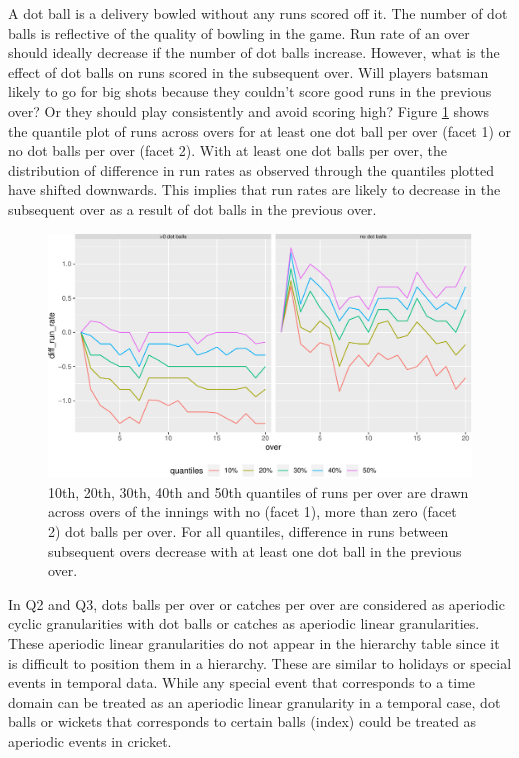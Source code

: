 \documentclass[12pt]{article}
\begin{document}
A dot ball is a delivery bowled without any runs scored off it. The number of dot balls is reflective of the quality of bowling in the game. Run rate of an over should ideally decrease if the number of dot balls increase. However, what is the effect of dot balls on runs scored in the subsequent over. Will players batsman likely to go for big shots because they couldn't score good runs in the previous over? Or they should play consistently and avoid scoring high? Figure \ref{fig:exdot} shows the quantile plot of runs across overs for at least one dot ball per over (facet 1) or no dot balls per over (facet 2).
With at least one dot balls per over, the distribution of difference in run rates as observed through the quantiles plotted have shifted downwards. This implies that run rates are likely to decrease in the subsequent over as a result of dot balls in the previous over.

\begin{figure}[ht]

{\centering \includegraphics[width=\textwidth]{figure/exdot-1} 

}

\caption{10th, 20th, 30th, 40th and 50th quantiles of runs per over are drawn  across overs of the innings with no (facet 1), more than zero (facet 2) dot balls per over. For all quantiles, difference in runs between subsequent overs decrease with at least one dot ball in the previous over.}\label{fig:exdot}
\end{figure}

In Q2 and Q3, dots balls per over or catches per over are considered as aperiodic cyclic granularities with dot balls or catches as aperiodic linear granularities. These aperiodic linear granularities do not appear in the hierarchy table since it is difficult to position them in a hierarchy. These are similar to holidays or special events in temporal data. While any special event that corresponds to a time domain can be treated as an aperiodic linear granularity in a temporal case, dot balls or wickets that corresponds to certain balls (index) could be treated as aperiodic events in cricket.
\end{document}
